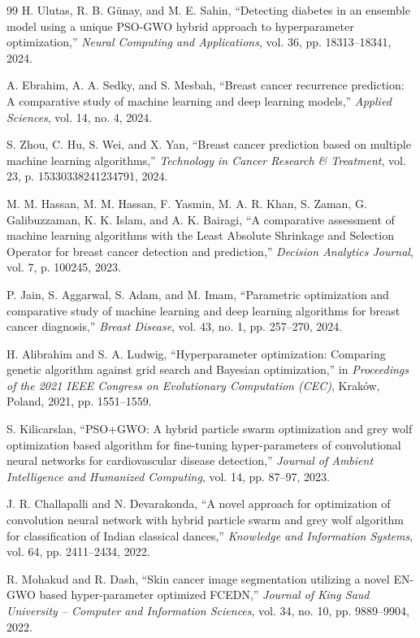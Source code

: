 \documentclass[letterpaper, 10 pt, conference]{ieeeconf}
\begin{document}
\begin{thebibliography}{99}
	 H. Ulutas, R. B. G\"unay, and M. E. Sahin, ``Detecting diabetes in an ensemble model using a unique PSO-GWO hybrid approach to hyperparameter optimization,'' \emph{Neural Computing and Applications}, vol. 36, pp. 18313--18341, 2024.

	 A. Ebrahim, A. A. Sedky, and S. Mesbah, ``Breast cancer recurrence prediction: A comparative study of machine learning and deep learning models,'' \emph{Applied Sciences}, vol. 14, no. 4, 2024.

	 S. Zhou, C. Hu, S. Wei, and X. Yan, ``Breast cancer prediction based on multiple machine learning algorithms,'' \emph{Technology in Cancer Research \& Treatment}, vol. 23, p. 15330338241234791, 2024.

	 M. M. Hassan, M. M. Hassan, F. Yasmin, M. A. R. Khan, S. Zaman, G. Galibuzzaman, K. K. Islam, and A. K. Bairagi, ``A comparative assessment of machine learning algorithms with the Least Absolute Shrinkage and Selection Operator for breast cancer detection and prediction,'' \emph{Decision Analytics Journal}, vol. 7, p. 100245, 2023.

	 P. Jain, S. Aggarwal, S. Adam, and M. Imam, ``Parametric optimization and comparative study of machine learning and deep learning algorithms for breast cancer diagnosis,'' \emph{Breast Disease}, vol. 43, no. 1, pp. 257--270, 2024.

	 H. Alibrahim and S. A. Ludwig, ``Hyperparameter optimization: Comparing genetic algorithm against grid search and Bayesian optimization,'' in \emph{Proceedings of the 2021 IEEE Congress on Evolutionary Computation (CEC)}, Krak\'ow, Poland, 2021, pp. 1551--1559.

	 S. Kilicarslan, ``PSO+GWO: A hybrid particle swarm optimization and grey wolf optimization based algorithm for fine-tuning hyper-parameters of convolutional neural networks for cardiovascular disease detection,'' \emph{Journal of Ambient Intelligence and Humanized Computing}, vol. 14, pp. 87--97, 2023.

	 J. R. Challapalli and N. Devarakonda, ``A novel approach for optimization of convolution neural network with hybrid particle swarm and grey wolf algorithm for classification of Indian classical dances,'' \emph{Knowledge and Information Systems}, vol. 64, pp. 2411--2434, 2022.

	 R. Mohakud and R. Dash, ``Skin cancer image segmentation utilizing a novel EN-GWO based hyper-parameter optimized FCEDN,'' \emph{Journal of King Saud University -- Computer and Information Sciences}, vol. 34, no. 10, pp. 9889--9904, 2022.


\end{thebibliography}
\end{document}
